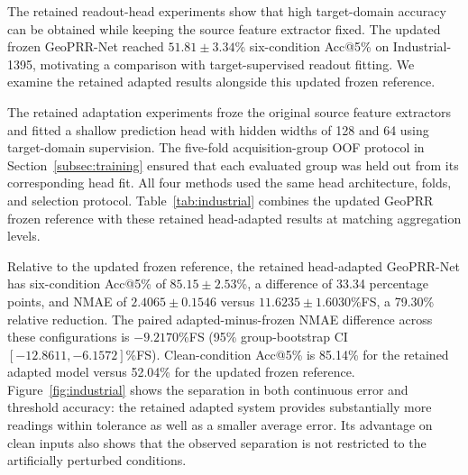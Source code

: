 \documentclass[electronics,article,submit,oneauthor]{Definitions/mdpi}
\newcommand{\modelname}{GeoPRR-Net\xspace}
\begin{document}
The retained readout-head experiments show that high target-domain accuracy can be obtained while keeping the source feature extractor fixed. The updated frozen \modelname reached $51.81\pm3.34$\% six-condition Acc@5\% on Industrial-1395, motivating a comparison with target-supervised readout fitting. We examine the retained adapted results alongside this updated frozen reference.

The retained adaptation experiments froze the original source feature extractors and fitted a shallow prediction head with hidden widths of 128 and 64 using target-domain supervision. The five-fold acquisition-group OOF protocol in Section~\ref{subsec:training} ensured that each evaluated group was held out from its corresponding head fit. All four methods used the same head architecture, folds, and selection protocol. Table~\ref{tab:industrial} combines the updated GeoPRR frozen reference with these retained head-adapted results at matching aggregation levels.

Relative to the updated frozen reference, the retained head-adapted \modelname has six-condition Acc@5\% of $85.15\pm2.53$\%, a difference of 33.34 percentage points, and NMAE of $2.4065\pm0.1546$ versus $11.6235\pm1.6030$\%FS, a 79.30\% relative reduction. The paired adapted-minus-frozen NMAE difference across these configurations is $-9.2170$\%FS (95\% group-bootstrap CI $[-12.8611,-6.1572]$\%FS). Clean-condition Acc@5\% is 85.14\% for the retained adapted model versus 52.04\% for the updated frozen reference. Figure~\ref{fig:industrial} shows the separation in both continuous error and threshold accuracy: the retained adapted system provides substantially more readings within tolerance as well as a smaller average error. Its advantage on clean inputs also shows that the observed separation is not restricted to the artificially perturbed conditions.
\end{document}
